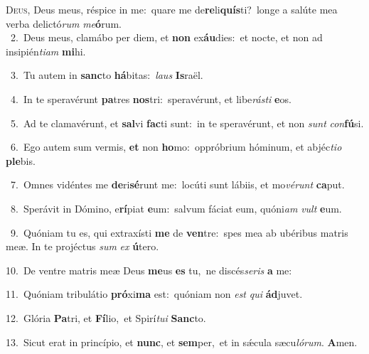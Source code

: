\lettrine{\initial\textcolor{\initialcolor}{D}}{eus,} Deus meus, réspice in me:~\dagger quare me de\-\textbf{re}\-li\-\textbf{quís}\-ti?~\star longe a salúte mea verba delictó\textit{rum} \textit{me}\-\textbf{ó}rum.\\
{\numbfont\textcolor{\numbcolor}{~2.}}~Deus meus, clamábo per diem, et \textbf{non} ex\-\textbf{áu}\-dies:~\star et nocte, et non ad insipién\-\textit{ti}\-\textit{am} \textbf{mi}\-hi.\par
{\numbfont\textcolor{\numbcolor}{~3.}}~Tu autem in \textbf{sanc}\-to \textbf{há}\-bitas:~\star \textit{laus} \textbf{Is}\-raël.\par
{\numbfont\textcolor{\numbcolor}{~4.}}~In te speravérunt \textbf{pa}\-tres \textbf{nos}\-tri:~\star speravérunt, et libe\-\textit{rás}\-\textit{ti} \textbf{e}\-os.\par
{\numbfont\textcolor{\numbcolor}{~5.}}~Ad te clamavérunt, et \textbf{sal}\-vi \textbf{fac}\-ti sunt:~\star in te speravérunt, et non \textit{sunt} \textit{con}\-\textbf{fú}si.\par
{\numbfont\textcolor{\numbcolor}{~6.}}~Ego autem sum vermis, \textbf{et} non \textbf{ho}\-mo:~\star oppróbrium hóminum, et abjéc\-\textit{ti}\-\textit{o} \textbf{ple}\-bis.\par
{\numbfont\textcolor{\numbcolor}{~7.}}~Omnes vidéntes me \textbf{de}\-ri\-\textbf{sé}\-runt me:~\star locúti sunt lábiis, et mo\-\textit{vé}\-\textit{runt} \textbf{ca}\-put.\par
{\numbfont\textcolor{\numbcolor}{~8.}}~Sperávit in Dómino, e\-\textbf{rí}\-piat \textbf{e}\-um:~\star salvum fáciat eum, quóni\textit{am} \textit{vult} \textbf{e}\-um.\par
{\numbfont\textcolor{\numbcolor}{~9.}}~Quóniam tu es, qui extraxísti \textbf{me} de \textbf{ven}\-tre:~\star spes mea ab ubéribus matris meæ. In te projéctus \textit{sum} \textit{ex} \textbf{ú}\-tero.\par
{\numbfont\textcolor{\numbcolor}{10.}}~De ventre matris meæ Deus \textbf{me}\-us \textbf{es} tu,~\star ne discés\-\textit{se}\-\textit{ris} \textbf{a} me:\par
{\numbfont\textcolor{\numbcolor}{11.}}~Quóniam tribulátio \textbf{pró}\-xi\textbf{ma} est:~\star quóniam non \textit{est} \textit{qui} \textbf{ád}\-juvet.\par
{\numbfont\textcolor{\numbcolor}{12.}}~Glória \textbf{Pa}\-tri, et \textbf{Fí}\-lio,~\star et Spirí\-\textit{tu}\-\textit{i} \textbf{Sanc}\-to.\par
{\numbfont\textcolor{\numbcolor}{13.}}~Sicut erat in princípio, et \textbf{nunc}\-, et \textbf{sem}\-per,~\star et in sǽcula sæcu\-\textit{ló}\-\textit{rum}. \textbf{A}\-men.\par
